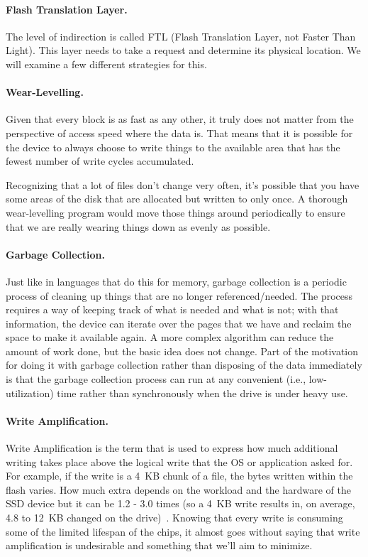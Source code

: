 \paragraph{Flash Translation Layer.}
The level of indirection is called FTL (Flash Translation Layer, not Faster Than Light). This layer needs to take a request and determine its physical location. We will examine a few different strategies for this. 

\paragraph{Wear-Levelling.} Given that every block is as fast as any other, it truly does not matter from the perspective of access speed where the data is. That means that it is possible for the device to always choose to write things to the available area that has the fewest number of write cycles accumulated. 

Recognizing that a lot of files don't change very often, it's possible that you have some areas of the disk that are allocated but written to only once. A thorough wear-levelling program would move those things around periodically to ensure that we are really wearing things down as evenly as possible. 

\paragraph{Garbage Collection.} Just like in languages that do this for memory, garbage collection is a periodic process of cleaning up things that are no longer referenced/needed. The process requires a way of keeping track of what is needed and what is not; with that information, the device can iterate over the pages that we have and reclaim the space to make it available again. A more complex algorithm can reduce the amount of work done, but the basic idea does not change. Part of the motivation for doing it with garbage collection rather than disposing of the data immediately is that the garbage collection process can run at any convenient (i.e., low-utilization) time rather than synchronously when the drive is under heavy use. 

\paragraph{Write Amplification.} Write Amplification is the term that is used to express how much additional writing takes place above the logical write that the OS or application asked for. For example, if the write is a 4~KB chunk of a file, the bytes written within the flash varies. How much extra depends on the workload and the hardware of the SSD device but it can be 1.2 - 3.0 times (so a 4~KB write results in, on average, 4.8 to 12~KB changed on the drive)~\cite{writeamp}. Knowing that every write is consuming some of the limited lifespan of the chips, it almost goes without saying that write amplification is undesirable and something that we'll aim to minimize.


